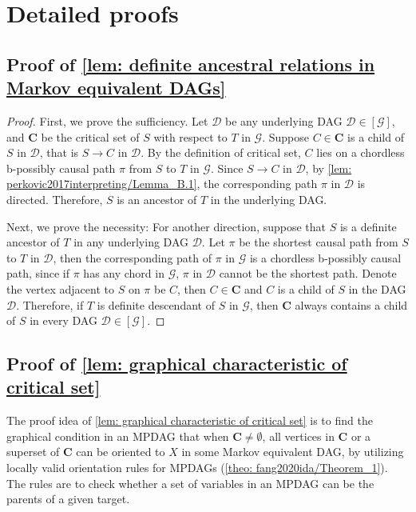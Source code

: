 \documentclass{article}
\begin{document}
\section{Detailed proofs}
\subsection{Proof of \cref{lem: definite ancestral relations in Markov equivalent DAGs}}
\label{proof_lem: definite ancestral relations in Markov equivalent DAGs}
\begin{proof}
    First, we prove the sufficiency. Let $\mathcal{D}$ be any underlying DAG $\mathcal{D} \in [\mathcal{G}]$, and $\mathbf{C}$ be the critical set of $S$ with respect to $T$ in $\mathcal{G}$. Suppose $C \in \mathbf{C}$ is a child of $S$ in $\mathcal{D}$, that is $S \rightarrow C$ in $\mathcal{D}$. By the definition of critical set, $C$ lies on a chordless b-possibly causal path $\pi$ from $S$ to $T$ in $\mathcal{G}$. Since $S \rightarrow C$ in $\mathcal{D}$, by \cref{lem: perkovic2017interpreting/Lemma_B.1}, the corresponding path $\pi$ in $\mathcal{D}$ is directed. Therefore, $S$ is an ancestor of $T$ in the underlying DAG. 
    
    Next, we prove the necessity: For another direction, suppose that $S$ is a definite ancestor of $T$ in any underlying DAG $\mathcal{D}$. Let $\pi$ be the shortest causal path from $S$ to $T$ in $\mathcal{D}$, then the corresponding path of $\pi$ in $\mathcal{G}$ is a chordless b-possibly causal path, since if $\pi$ has any chord in $\mathcal{G}$, $\pi$ in $\mathcal{D}$ cannot be the shortest path. Denote the vertex adjacent to $S$ on $\pi$ be $C$, then $C \in \mathbf{C}$ and $C$ is a child of $S$ in the DAG $\mathcal{D}$. Therefore, if $T$ is definite descendant of $S$ in $\mathcal{G}$, then $\mathbf{C}$ always contains a child of $S$ in every DAG $\mathcal{D} \in [\mathcal{G}]$.
\end{proof}


\subsection{Proof of \cref{lem: graphical characteristic of critical set}}
\label{proof_lem: graphical characteristic of critical set}
The proof idea of \cref{lem: graphical characteristic of critical set} is to find the graphical condition in an MPDAG that when $\mathbf{C} \neq \emptyset$, all vertices in $\mathbf{C}$ or a superset of $\mathbf{C}$ can be oriented to $X$ in some Markov equivalent DAG, by utilizing locally valid orientation rules for MPDAGs (\cref{theo: fang2020ida/Theorem_1}). The rules are to check whether a set of variables in an MPDAG can be the parents of a given target. 
\end{document}
